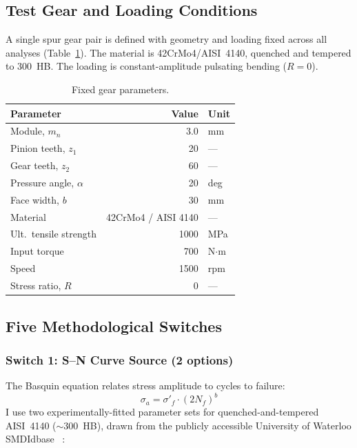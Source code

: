 \documentclass[12pt,a4paper]{article}
\begin{document}
\subsection{Test Gear and Loading Conditions}

A single spur gear pair is defined with geometry and loading fixed
across all analyses (Table~\ref{tab:gear}). The material is
42CrMo4/AISI~4140, quenched and tempered to 300~HB. The loading is
constant-amplitude pulsating bending ($R=0$).

\begin{table}[h]
\centering
\caption{Fixed gear parameters.}
\label{tab:gear}
\begin{tabular}{p{4.5cm} r l}
\toprule
Parameter & Value & Unit \\
\midrule
Module, $m_n$ & 3.0 & mm \\
Pinion teeth, $z_1$ & 20 & --- \\
Gear teeth, $z_2$ & 60 & --- \\
Pressure angle, $\alpha$ & 20 & deg \\
Face width, $b$ & 30 & mm \\
Material & 42CrMo4 / AISI 4140 & --- \\
Ult.\ tensile strength & 1000 & MPa \\
Input torque & 700 & N$\cdot$m \\
Speed & 1500 & rpm \\
Stress ratio, $R$ & 0 & --- \\
\bottomrule
\end{tabular}
\end{table}

\subsection{Five Methodological Switches}

\subsubsection{Switch 1: S--N Curve Source (2 options)}

The Basquin equation relates stress amplitude to cycles to failure:
\begin{equation}
\sigma_a = \sigma'_f \cdot (2N_f)^b
\label{eq:basquin}
\end{equation}
I use two experimentally-fitted
parameter sets for quenched-and-tempered AISI~4140 ($\sim$300~HB),
drawn from the publicly accessible University of Waterloo SMDIdbase%
~\cite{waterloo_fde}:
\end{document}
